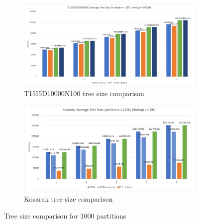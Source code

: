 \begin{figure}
  \centering
  \begin{subfigure}{\linewidth}
  \centering
  \includegraphics[width=\linewidth ,height=\textheight, keepaspectratio]{figures/4iterations/T15I5D10000N100_AvgTree_Partitins1000_0001}
  \caption{T15I5D10000N100 tree size comparison}
  \label{fig:T15I5D10000N100_AvgTree_Partitins1000_0001}
\end{subfigure}
  \begin{subfigure}{\linewidth}
  \centering
  \includegraphics[width=\linewidth ,height=\textheight, keepaspectratio]{figures/4iterations/kosarak_AvgTree_Partitins1000_001}
  \caption{Kosarak tree size comparison}
  \label{fig:kosarak_AvgTree_Partitins1000_001}
\end{subfigure}
\caption{Tree size comparison for 1000 partitions}
\end{figure}

